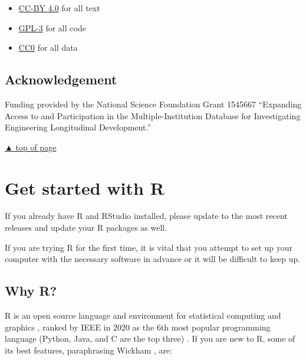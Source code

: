 \documentclass[
]{book}
\providecommand{\tightlist}{%
  \setlength{\itemsep}{0pt}\setlength{\parskip}{0pt}}
\begin{document}
\begin{itemize}
\tightlist
\item
  \href{https://creativecommons.org/licenses/by/4.0/legalcode}{CC-BY 4.0} for all text\\
\item
  \href{https://www.r-project.org/Licenses/GPL-3}{GPL-3} for all code\\
\item
  \href{https://wiki.creativecommons.org/wiki/CC0_use_for_data}{CC0} for all data
\end{itemize}

\hypertarget{acknowledgement}{%
\section*{Acknowledgement}\label{acknowledgement}}

Funding provided by the National Science Foundation Grant 1545667 ``Expanding Access to and Participation in the Multiple-Institution Database for Investigating Engineering Longitudinal Development.''

\protect\hyperlink{introduction}{▲ top of page}

\hypertarget{get-start-r}{%
\chapter{Get started with R}\label{get-start-r}}

If you already have R and RStudio installed, please update to the most recent releases and update your R packages as well.

If you are trying R for the first time, it is vital that you attempt to set up your computer with the necessary software in advance or it will be difficult to keep up.

\hypertarget{why-r}{%
\section*{Why R?}\label{why-r}}

R is an open source language and environment for statistical computing and graphics \citep{R-base}, ranked by IEEE in 2020 as the 6th most popular programming language (Python, Java, and C are the top three) \citep{Cass:2020}. If you are new to R, some of its best features, paraphrasing Wickham \citeyearpar{wickham2014advanced}, are:
\end{document}
